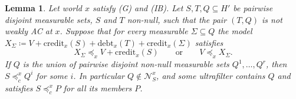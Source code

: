 \documentclass[11pt]{article}
\newtheorem{lemma}[theorem]{Lemma}
\theoremstyle{definition}\newtheorem{definition}[theorem]{Definition}
\theoremstyle{remark}\newtheorem{remark}[theorem]{Remark}
\newcommand{\debt}{\mathrm{debt}}
\newcommand{\cred}{\mathrm{credit}}
\newcommand{\Nid}{\mathcal N}
\begin{document}
\begin{lemma}\label{lem:sweep}
Let world $x$ satisfy (G) and (IB). Let $S,T,Q\subseteq H'$ be pairwise
disjoint measurable sets, $S$ and $T$ non-null, such that the pair $(T,Q)$
is not weakly AC at $x$. Suppose that for every measurable
$\Sigma\subseteq Q$ the model
$X_\Sigma\coloneqq V+\cred_x(S)+\debt_x(T)+\cred_x(\Sigma)$ satisfies
\begin{equation}
 X_\Sigma\preceq_xV+\cred_x(S)\qquad\text{or}\qquad V\preceq_xX_\Sigma.
 \label{eq:cover}
\end{equation}
If $Q$ is the union of pairwise disjoint non-null measurable sets
$Q^1,\dots,Q^r$, then $S\preceq^x_cQ^i$ for some $i$. In particular
$Q\notin\Nid^x_S$, and some ultrafilter contains $Q$ and satisfies
$S\preceq^x_cP$ for all its members $P$.
\end{lemma}
\end{document}
